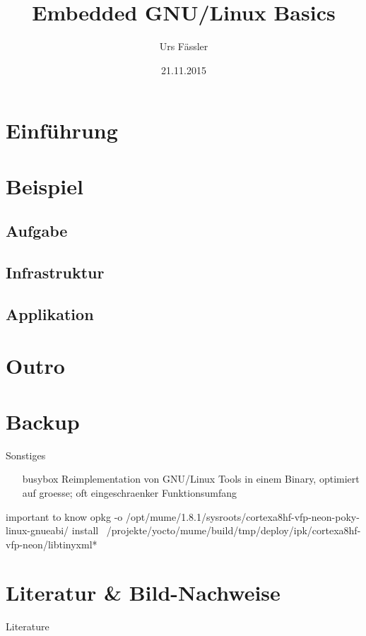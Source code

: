\documentclass
[
  12pt,
  svgnames		%
]{beamer}
\title{Embedded GNU/Linux Basics}
\author{Urs Fässler}
\date{21.11.2015}
\institute
{
  17. LinuxDay\\
  Dornbirn
}
\begin{document}
\frame{\titlepage}

\section{Einführung}

\section{Beispiel}
\subsection{Aufgabe}

\subsection{Infrastruktur}

\subsection{Applikation}

\section{Outro}


{
\appendix

\section{Backup}



\begin{frame}{Sonstiges}
	\begin{itemize}
		\item[busybox] Reimplementation von GNU/Linux Tools in einem Binary, optimiert auf groesse; oft eingeschraenker Funktionsumfang
	\end{itemize}
\end{frame}

\begin{frame}{important to know}
opkg -o /opt/mume/1.8.1/sysroots/cortexa8hf-vfp-neon-poky-linux-gnueabi/ install ~/projekte/yocto/mume/build/tmp/deploy/ipk/cortexa8hf-vfp-neon/libtinyxml*
\end{frame}

\section{Literatur \& Bild-Nachweise}
\begin{frame}[allowframebreaks]{Literature}
	\tiny{
		
	}
\end{frame}

}
\end{document}

